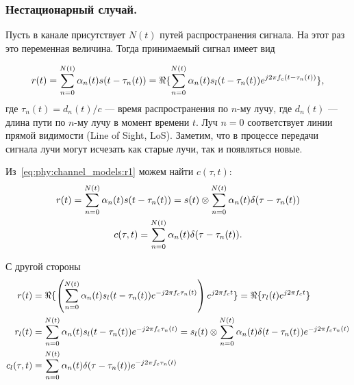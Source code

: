 \documentclass{book}
\numberwithin{theorem}{chapter}
\numberwithin{statement}{chapter}
\numberwithin{lemma}{chapter}
\theoremstyle{definition}
\numberwithin{task}{chapter}
\theoremstyle{remark}
\numberwithin{example}{chapter}
\theoremstyle{definition}
\numberwithin{definition}{chapter}
\theoremstyle{remark}
\theoremstyle{remark}
\numberwithin{lyrics}{section}
\begin{document}




\subsubsection{Нестационарный случай.}
Пусть в канале присутствует $N(t)$ путей распространения сигнала. На этот раз это переменная величина. Тогда принимаемый сигнал имеет вид

\begin{equation}
\label{eq:phy:channel_models:r1}
r(t) = \sum\limits_{n = 0}^{N(t)} \alpha_n(t) s(t - \tau_n(t)) = \Re\{\sum\limits_{n = 0}^{N(t)} \alpha_n(t) s_l(t - \tau_n(t)) e^{j2\pi f_c (t - \tau_n(t))}\},
\end{equation}
где $\tau_n(t) = d_n(t) / c$ --- время распространения по $n$-му лучу, где $d_n(t)$ --- длина пути по $n$-му лучу в момент времени $t$. Луч $n = 0$ соответствует линии прямой видимости (Line of Sight, LoS). Заметим, что в процессе передачи сигнала лучи могут исчезать как старые лучи, так и появляться новые. 

Из~\eqref{eq:phy:channel_models:r1} можем найти $c(\tau, t)$:
\begin{gather}
r(t) = \sum\limits_{n = 0}^{N(t)} \alpha_n(t) s(t - \tau_n(t)) = s(t) \otimes \sum\limits_{n=0}^{N(t)} \alpha_n(t) \delta(\tau - \tau_n(t)) \\
c(\tau, t) = \sum\limits_{n=0}^{N(t)} \alpha_n(t) \delta(\tau - \tau_n(t)). 
\end{gather}

С другой стороны
\begin{align}
\label{eq:phy:channel_models:r2}
r(t) &= \Re\{\left(\sum\limits_{n = 0}^{N(t)} \alpha_n(t) s_l(t - \tau_n(t)) e^{-j2\pi f_c \tau_n(t)} \right)e^{j2\pi f_c t}\} = \Re\{r_l(t)e^{j2\pi f_c t}\} \\
r_l(t) &= \sum\limits_{n = 0}^{N(t)} \alpha_n(t) s_l(t - \tau_n(t)) e^{-j2\pi f_c \tau_n(t)} = s_l(t) \otimes \sum\limits_{n = 0}^{N(t)} \alpha_n(t) \delta(t - \tau_n(t)) e^{-j2\pi f_c \tau_n(t)} \\
c_l(\tau, t) &= \sum\limits_{n = 0}^{N(t)} \alpha_n(t) \delta(\tau - \tau_n(t)) e^{-j2\pi f_c \tau_n(t)}
\end{align}
\end{document}
